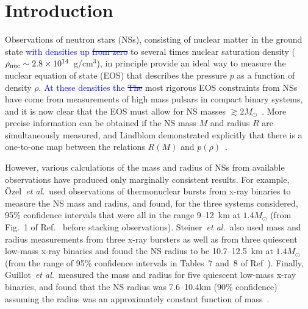 \documentclass[twocolumn,prd,amssymb,aps,nofootinbib,showpacs,epsf]{revtex4}
\newcommand\les[2]{\textcolor{blue}{{#1}\sout{#2}}}
\begin{document}
\maketitle


\section{Introduction}

Observations of neutron stars (NSs), consisting of nuclear matter in the ground state \les{with densities up }{from zero} to several times nuclear saturation density ($\rho_{\rm nuc}\sim2.8\times 10^{14}$~g/cm$^3$), in principle provide an ideal way to measure the nuclear equation of state (EOS) that describes the pressure $p$ as a function of density $\rho$. \les{At these densities the }{The} most rigorous EOS constraints from NSs have come from measurements of high mass pulsars in compact binary systems, and it is now clear that the EOS must allow for NS masses $\gtrsim 2 M_\odot$~\cite{DemorestPennucciRansom2010, AntoniadisFreireWex2013}. More precise information can be obtained if the NS mass $M$ and radius $R$ are simultaneously measured, and Lindblom demonstrated explicitly that there is a one-to-one map between the relations $R(M)$ and $p(\rho)$~\cite{Lindblom1992}. 

However, various calculations of the mass and radius of NSs from available observations have produced only marginally consistent results. For example, \"Ozel~{\it et al.}\ used observations of thermonuclear bursts from x-ray binaries to measure the NS mass and radius, and found, for the three systems considered, 95\% confidence intervals that were all in the range 9--12~km at $1.4M_\odot$ (from Fig.~1 of Ref.~\cite{OzelBaymGuver2010} before stacking observations). Steiner~{\it et al.}\ also used mass and radius measurements from three x-ray bursters as well as from three quiescent low-mass x-ray binaries and found the NS radius to be 10.7--12.5~km at $1.4M_\odot$ (from the range of 95\% confidence intervals in Tables~7 and~8 of Ref~\cite{SteinerLattimerBrown2010}). Finally, Guillot~{\it et al.}\ measured the mass and radius for five quiescent low-mass x-ray binaries, and found that the NS radius was 7.6--10.4km (90\% confidence) assuming the radius was an approximately constant function of mass~\cite{GuillotServillatWebb2013}.
\end{document}
